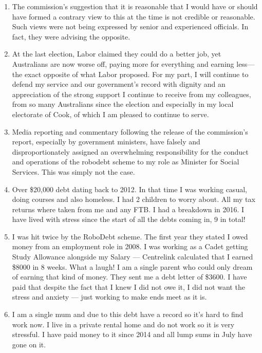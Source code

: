 \documentclass{article}
\begin{document}
\begin{enumerate}
\item The commission's suggestion that it is reasonable that I would have or should have formed a contrary view to this at the time is not credible or reasonable. Such views were not being expressed by senior and experienced officials. In fact, they were advising the opposite.

\item At the last election, Labor claimed they could do a better job, yet Australians are now worse off, paying more for everything and earning less—the exact opposite of what Labor proposed. For my part, I will continue to defend my service and our government's record with dignity and an appreciation of the strong support I continue to receive from my colleagues, from so many Australians since the election and especially in my local electorate of Cook, of which I am pleased to continue to serve.

\item Media reporting and commentary following the release of the commission's report, especially by government ministers, have falsely and disproportionately assigned an overwhelming responsibility for the conduct and operations of the robodebt scheme to my role as Minister for Social Services. This was simply not the case.

\item Over \$20,000 debt dating back to 2012. In that time I was working casual, doing courses and also homeless. I had 2 children to worry about. All my tax returns where taken from me and any FTB. I had a breakdown in 2016. I have lived with stress since the start of all the debts coming in, 9 in total!

\item I was hit twice by the RoboDebt scheme. The first year they stated I owed money from an employment role in 2008. I was working as a Cadet getting Study Allowance alongside my Salary — Centrelink calculated that I earned \$8000 in 8 weeks. What a laugh! I am a single parent who could only dream of earning that kind of money. They sent me a debt letter of \$3600. I have paid that despite the fact that I knew I did not owe it, I did not want the stress and anxiety — just working to make ends meet as it is. 

\item I am a single mum and due to this debt have a record so it's hard to find work now. I live in a private rental home and do not work so it is very stressful. I have paid money to it since 2014 and all lump sums in July have gone on it.


\end{enumerate}
\end{document}
